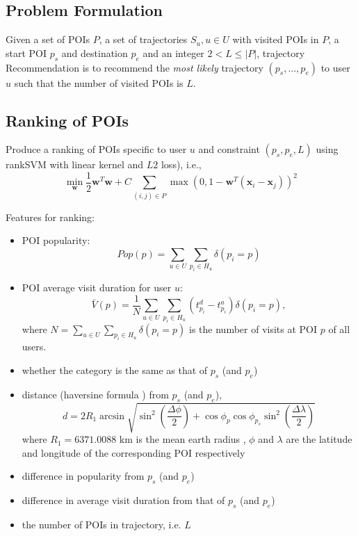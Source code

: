 \documentclass{sig-alternate-05-2015}
\begin{document}
\subsection{Problem Formulation}
\label{sec:formulation}
Given a set of POIs $P$, a set of trajectories ${S_u}, u \in U$ with visited POIs in $P$, 
a start POI $p_s$ and destination $p_e$ and an integer $2 < L \le |P|$,
trajectory Recommendation is to recommend the \textit{most likely} trajectory $(p_s, \dots, p_e)$ to user $u$ such that
the number of visited POIs is $L$.


\subsection{Ranking of POIs}
Produce a ranking of POIs specific to user $u$ and constraint $(p_s, p_e, L)$ 
using rankSVM with linear kernel and $L2$ loss)\cite{lranksvm}, 
i.e.,
\begin{displaymath}
\min_{\mathbf{w}} \frac{1}{2} \mathbf{w}^T \mathbf{w} +
                  C \sum_{(i, j) \in P} \max \left( 0, 1 - \mathbf{w}^T (\mathbf{x}_i - \mathbf{x}_j) \right)^2
\end{displaymath}

Features for ranking:
\begin{itemize}
\item POI popularity\cite{ijcai15}: 
      \begin{displaymath}
      Pop(p) = \sum_{u \in U} \sum_{p_i \in H_u} \delta(p_i = p)
      \end{displaymath}
\item POI average visit duration\cite{ijcai15} for user $u$:
      \begin{displaymath}
          \bar{V}(p) = \frac{1}{N} \sum_{u \in U} \sum_{p_i \in H_u} (t_{p_i}^d - t_{p_i}^a) \delta(p_i = p),
      \end{displaymath}
      where $N = \sum_{u \in U} \sum_{p_i \in H_u} \delta(p_i = p)$ is the number of visits at POI $p$ of all users.
\item whether the category is the same as that of $p_s$ (and $p_e$)
\item distance (haversine formula \cite{wiki_haversine}) from $p_s$ (and $p_e$), 
      \begin{displaymath}
      d = 2 R_1 \arcsin \sqrt{ \sin^2 \left( \frac{\Delta \phi}{2} \right) + 
           \cos \phi_p \cos \phi_{p_s} \sin^2 \left( \frac{\Delta \lambda}{2} \right) }
      \end{displaymath}
            where $R_1 = 6371.0088$ km is the mean earth radius \cite{wiki_earth_radius}, 
            $\phi$ and $\lambda$ are the latitude and longitude of the corresponding POI respectively
\item difference in popularity from $p_s$ (and $p_e$)
\item difference in average visit duration from that of $p_s$ (and $p_e$)
\item the number of POIs in trajectory, i.e. $L$
\end{itemize}
\end{document}
